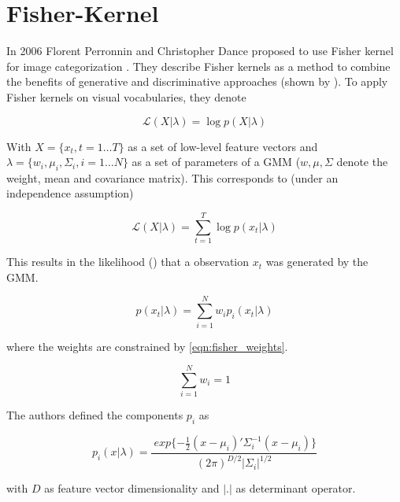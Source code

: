 \section{Fisher-Kernel}

In 2006 Florent Perronnin and Christopher Dance proposed to use Fisher kernel for image categorization \cite{Perronnin2006}. They describe Fisher kernels as a method to combine the benefits of generative and discriminative approaches (shown by \cite{jaakkola1999exploiting}). To apply Fisher kernels on visual vocabularies, they denote

\begin{equation}
\mathcal{L} (X|\lambda) = \log p(X|\lambda)
\end{equation}

With $X = \{x_t, t = 1 \dots T\}$ as a set of low-level feature vectors and $\lambda = \{w_i, \mu_i, \Sigma_i, i = 1 \dots N\}$ as a set of parameters of a \acf{GMM} ($w, \mu, \Sigma$ denote the weight, mean and covariance matrix). This corresponds to (under an independence assumption)

\begin{equation}
\mathcal{L} (X|\lambda) = \sum_{t=1}^{T} \log p(x_t|\lambda)
\end{equation}

This results in the likelihood () that a observation $x_t$ was generated by the \ac{GMM}.

\begin{equation}
p(x_t|\lambda) = \sum_{i=1}^{N} w_i p_i (x_t|\lambda)
\label{eqn:fisher_likelihood}
\end{equation}

where the weights are constrained by \ref{eqn:fisher_weights}.

\begin{equation}
\sum_{i=1}^{N} w_i = 1
\label{eqn:fisher_weights}
\end{equation}

The authors defined the components $p_i$ as

\begin{equation}
p_i(x|\lambda) = \frac{
	\ 	exp \{-\frac{1}{2} (x-\mu_i)' \Sigma_{i}^{-1} (x-\mu_i)\}
}{
	(2 \pi)^{D/2} | \Sigma_i |^{1/2}
}
\end{equation}

with $D$ as feature vector dimensionality and $|.|$ as determinant operator.
